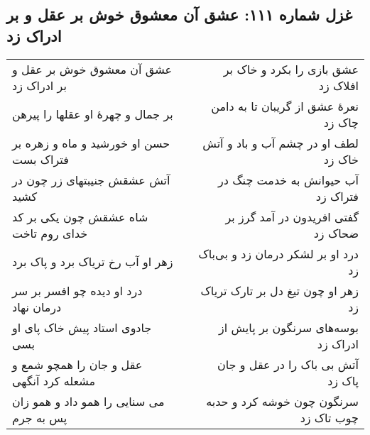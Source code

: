\begin{center}
\section*{غزل شماره ۱۱۱: عشق آن معشوق خوش بر عقل و بر ادراک زد}
\label{sec:111}
\begin{longtable}{l p{0.5cm} r}
عشق آن معشوق خوش بر عقل و بر ادراک زد
&&
عشق بازی را بکرد و خاک بر افلاک زد
\\
بر جمال و چهرهٔ او عقلها را پیرهن
&&
نعرهٔ عشق از گریبان تا به دامن چاک زد
\\
حسن او خورشید و ماه و زهره بر فتراک بست
&&
لطف او در چشم آب و باد و آتش خاک زد
\\
آتش عشقش جنیبتهای زر چون در کشید
&&
آب حیوانش به خدمت چنگ در فتراک زد
\\
شاه عشقش چون یکی بر کد خدای روم تاخت
&&
گفتی افریدون در آمد گرز بر ضحاک زد
\\
زهر او آب رخ تریاک برد و پاک برد
&&
درد او بر لشکر درمان زد و بی‌باک زد
\\
درد او دیده چو افسر بر سر درمان نهاد
&&
زهر او چون تیغ دل بر تارک تریاک زد
\\
جادوی استاد پیش خاک پای او بسی
&&
بوسه‌های سرنگون بر پایش از ادراک زد
\\
عقل و جان را همچو شمع و مشعله کرد آنگهی
&&
آتش بی باک را در عقل و جان پاک زد
\\
می سنایی را همو داد و همو زان پس به جرم
&&
سرنگون چون خوشه کرد و حدبه چوب تاک زد
\\
\end{longtable}
\end{center}
